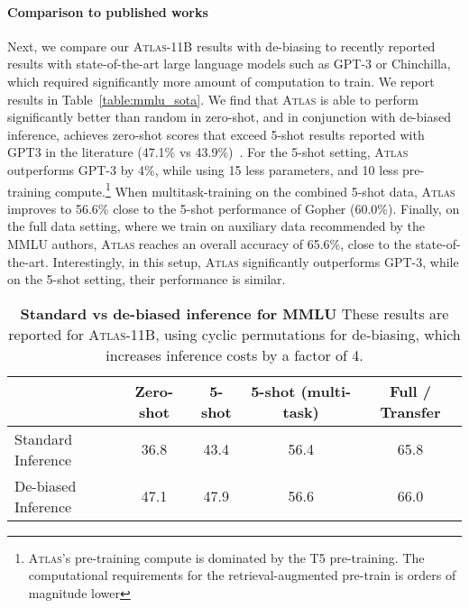 \documentclass[10pt]{article} \usepackage[preprint]{tmlr}
\newcommand{\Atlas}{\textsc{Atlas}}
\begin{document}
\paragraph{Comparison to published works} 
Next, we compare our \Atlas{}-11B results with de-biasing  to recently reported results with state-of-the-art large language models such as GPT-3 or Chinchilla, which required significantly more amount of computation to train.
We report results in Table~\ref{table:mmlu_sota}.
We find that \Atlas{} is able to perform significantly better than random in zero-shot, and in conjunction with de-biased inference, achieves zero-shot  scores that exceed 5-shot results reported with GPT3 in the literature (47.1\% vs 43.9\%)~\citep{hendrycks2021mmlu}.
For the 5-shot setting, \Atlas{} outperforms GPT-3 by 4\%, while using 15 less parameters, and 10 less pre-training compute.\footnote{\Atlas{}'s pre-training compute is dominated by the T5 pre-training. The computational requirements for the retrieval-augmented pre-train is orders of magnitude lower}
When multitask-training on the combined 5-shot data, \Atlas{} improves to 56.6\%  close to the 5-shot performance of Gopher (60.0\%).
Finally, on the full data setting, where we train on auxiliary data recommended by the MMLU authors, \Atlas{} reaches an overall accuracy of 65.6\%,  close to the state-of-the-art.
Interestingly, in this setup, \Atlas{} significantly outperforms GPT-3, while on the 5-shot setting, their performance is similar.

\begin{table}[t]
  \centering
  \caption{\textbf{Standard vs de-biased inference for MMLU} These results are reported for \Atlas{}-11B, using cyclic permutations for de-biasing, which increases inference costs by a factor of 4. }
  \label{tab:mmlu_debias_comp}
  \vspace{0.5em}
  \begin{tabular}{l ccc c}
    \toprule
    &  Zero-shot & 5-shot & 5-shot (multi-task) & Full / Transfer \\
    \midrule
    Standard Inference & 36.8	&	43.4	&	56.4	&	65.8\\
    De-biased Inference & 47.1	&	47.9	&	56.6	&	66.0\\
    \bottomrule
  \end{tabular}
\end{table}
\end{document}
